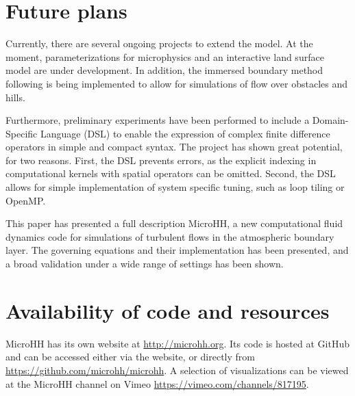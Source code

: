 \documentclass[gmd]{copernicus}
\begin{document}
\section{Future plans}
Currently, there are several ongoing projects to extend the model. At the moment, parameterizations for microphysics and an interactive land surface model are under development. In addition, the immersed boundary method following \citet{Tseng2003} is being implemented to allow for simulations of flow over obstacles and hills.

Furthermore, preliminary experiments have been performed to include a Domain-Specific Language (DSL) to enable the expression of complex finite difference operators in simple and compact syntax. The project has shown great potential, for two reasons. First, the DSL prevents errors, as the explicit indexing in computational kernels with spatial operators can be omitted. Second, the DSL allows for simple implementation of system specific tuning, such as loop tiling or OpenMP.

\conclusions  \label{sec:conclusion} %
This paper has presented a full description MicroHH, a new computational fluid dynamics code for simulations of turbulent flows in the atmospheric boundary layer. The governing equations and their implementation has been presented, and a broad validation under a wide range of settings has been shown.

\section{Availability of code and resources}
MicroHH has its own website at \url{http://microhh.org}. Its code is hosted at GitHub and can be accessed either via the website, or directly from 
\url{https://github.com/microhh/microhh}. A selection of visualizations can be viewed at the MicroHH channel on Vimeo \url{https://vimeo.com/channels/817195}.

\iffalse
\end{document}
